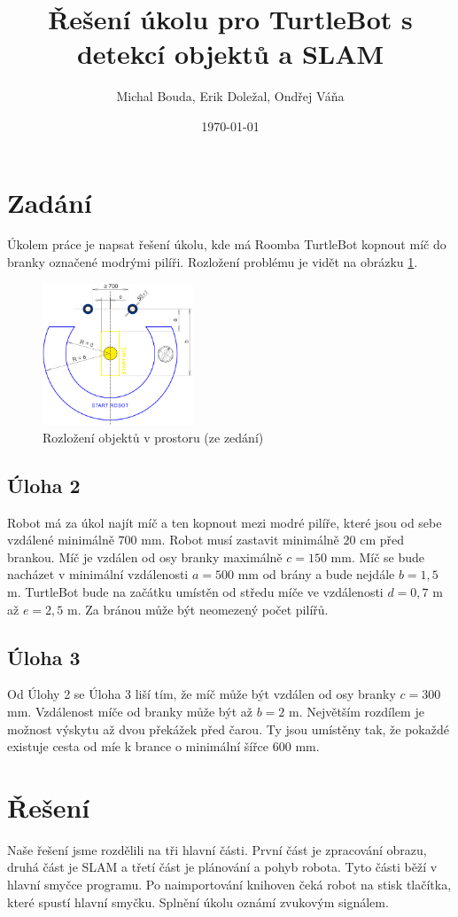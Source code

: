 \documentclass[a4paper,12pt]{article}
\title{Řešení úkolu pro TurtleBot s detekcí objektů a SLAM}
\author{Michal Bouda, Erik Doležal, Ondřej Váňa}
\date{\today}
\begin{document}
\maketitle

\tableofcontents

\section{Zadání}
Úkolem práce je napsat řešení úkolu, kde má Roomba TurtleBot kopnout míč do branky označené modrými pilíři.
Rozložení problému je vidět na obrázku \ref{fig:map}.
\begin{figure}[H]
\centering
\includegraphics[width=0.4\textwidth]{pictures/map.png}
\caption{Rozložení objektů v prostoru (ze zedání)}
\label{fig:map}	
\end{figure}

\subsection{Úloha 2}
Robot má za úkol najít míč a ten kopnout mezi modré pilíře, které jsou od sebe vzdálené minimálně $700$ mm. Robot musí zastavit minimálně $20$ cm před brankou. Míč je vzdálen od osy branky maximálně $c = 150$ mm.
Míč se bude nacházet v minimální vzdálenosti $a = 500$ mm od brány a bude nejdále $b = 1,5$ m. TurtleBot bude na začátku umístěn od středu míče ve vzdálenosti $d = 0,7$ m až $e = 2,5$ m.
Za bránou může být neomezený počet pilířů.

\subsection{Úloha 3}
Od Úlohy 2 se Úloha 3 liší tím, že míč může být vzdálen od osy branky $c = 300$ mm. Vzdálenost míče od branky může být až $b = 2$ m.
Největším rozdílem je možnost výskytu až dvou překážek před čarou. Ty jsou umístěny tak, že pokaždé existuje cesta od míe k brance o minimální šířce $600$ mm.

\section{Řešení}
Naše řešení jsme rozdělili na tři hlavní části. První část je zpracování obrazu, druhá část je SLAM a třetí část je plánování a pohyb robota. Tyto části běží v hlavní smyčce programu. 
Po naimportování knihoven čeká robot na stisk tlačítka, které spustí hlavní smyčku. Splnění úkolu oznámí zvukovým signálem.
\end{document}
